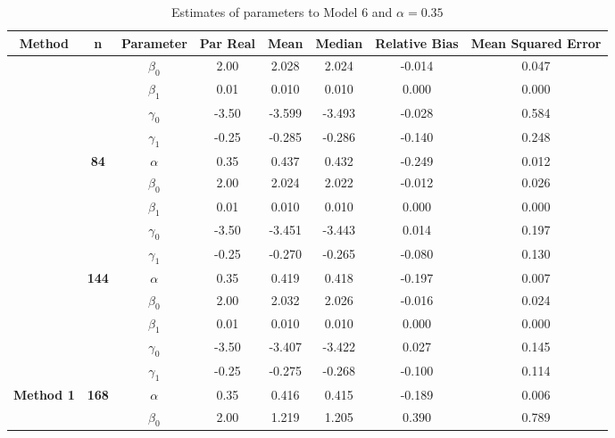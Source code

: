 \begin{table}[h]

\caption{\label{tab:Est_model_6_Alpha0.35}Estimates of parameters to Model 6 and $\alpha=0.35$}
\centering
\begin{tabular}[t]{>{}c>{}ccccccc}
\toprule
Method & n & Parameter & Par Real & Mean & Median & Relative Bias & Mean Squared Error\\
\midrule
 &  & $\beta_0$ & 2.00 & 2.028 & 2.024 & -0.014 & 0.047\\

 &  & $\beta_1$ & 0.01 & 0.010 & 0.010 & 0.000 & 0.000\\

 &  & $\gamma_0$ & -3.50 & -3.599 & -3.493 & -0.028 & 0.584\\

 &  & $\gamma_1$ & -0.25 & -0.285 & -0.286 & -0.140 & 0.248\\

 & \multirow{-5}{*}{\centering\arraybackslash \textbf{84}} & $\alpha$ & 0.35 & 0.437 & 0.432 & -0.249 & 0.012\\

 &  & $\beta_0$ & 2.00 & 2.024 & 2.022 & -0.012 & 0.026\\

 &  & $\beta_1$ & 0.01 & 0.010 & 0.010 & 0.000 & 0.000\\

 &  & $\gamma_0$ & -3.50 & -3.451 & -3.443 & 0.014 & 0.197\\

 &  & $\gamma_1$ & -0.25 & -0.270 & -0.265 & -0.080 & 0.130\\

 & \multirow{-5}{*}{\centering\arraybackslash \textbf{144}} & $\alpha$ & 0.35 & 0.419 & 0.418 & -0.197 & 0.007\\

 &  & $\beta_0$ & 2.00 & 2.032 & 2.026 & -0.016 & 0.024\\

 &  & $\beta_1$ & 0.01 & 0.010 & 0.010 & 0.000 & 0.000\\

 &  & $\gamma_0$ & -3.50 & -3.407 & -3.422 & 0.027 & 0.145\\

 &  & $\gamma_1$ & -0.25 & -0.275 & -0.268 & -0.100 & 0.114\\

\multirow{-15}{*}{\centering\arraybackslash \textbf{Method 1}} & \multirow{-5}{*}{\centering\arraybackslash \textbf{168}} & $\alpha$ & 0.35 & 0.416 & 0.415 & -0.189 & 0.006\\
\cmidrule{1-8}
 &  & $\beta_0$ & 2.00 & 1.219 & 1.205 & 0.390 & 0.789\\


\end{tabular}
\end{table}
